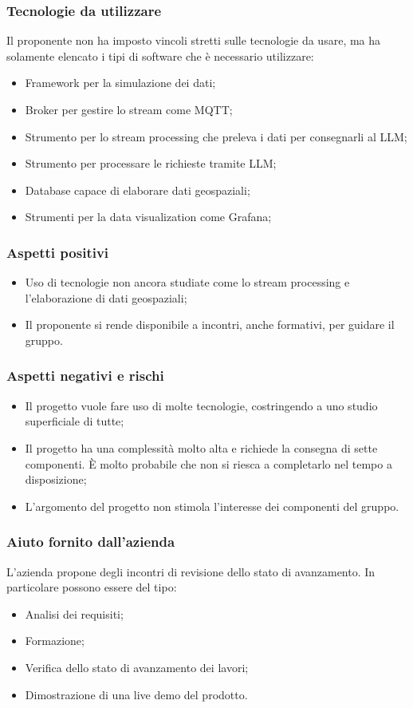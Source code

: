 \documentclass[10pt]{article}
\begin{document}
\subsubsection{Tecnologie da utilizzare}
Il proponente non ha imposto vincoli stretti sulle tecnologie da usare, ma ha solamente elencato i tipi di software che è necessario utilizzare:
\begin{itemize}
    \item Framework per la simulazione dei dati;
    \item Broker per gestire lo stream come MQTT;
    \item Strumento per lo stream processing che preleva i dati per consegnarli al LLM;
    \item Strumento per processare le richieste tramite LLM;
    \item Database capace di elaborare dati geospaziali;
    \item Strumenti per la data visualization come Grafana;
\end{itemize}
\subsubsection{Aspetti positivi}
\begin{itemize}
    \item Uso di tecnologie non ancora studiate come lo stream processing e l’elaborazione di dati geospaziali;
    \item Il proponente si rende disponibile a incontri, anche formativi, per guidare il gruppo.
\end{itemize}
\subsubsection{Aspetti negativi e rischi}
\begin{itemize}
    \item Il progetto vuole fare uso di molte tecnologie, costringendo a uno studio superficiale di tutte;
    \item Il progetto ha una complessità molto alta e richiede la consegna di sette componenti. È molto probabile che non si riesca a completarlo nel tempo a disposizione;
    \item L’argomento del progetto non stimola l’interesse dei componenti del gruppo.
\end{itemize}
\subsubsection{Aiuto fornito dall'azienda}
L’azienda propone degli incontri di revisione dello stato di avanzamento. In particolare possono essere del tipo:
\begin{itemize}
    \item Analisi dei requisiti;
    \item Formazione;
    \item Verifica dello stato di avanzamento dei lavori;
    \item Dimostrazione di una live demo del prodotto.
\end{itemize}
\end{document}
